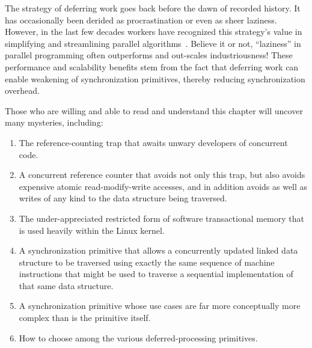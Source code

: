 
%

The strategy of deferring work goes back before the dawn of recorded
history.
It has occasionally been derided as procrastination or even as sheer laziness.
However, in the last few decades workers have recognized this strategy's value
in simplifying and streamlining parallel algorithms~\cite{Kung80,
HMassalinPhD,ValerieAurora2008Synthesis}.
Believe it or not, ``laziness'' in parallel programming often outperforms and
out-scales industriousness!
These performance and scalability benefits stem from the fact that
deferring work can enable weakening of synchronization primitives,
thereby reducing synchronization overhead.

Those who are willing and able to read and understand this chapter
will uncover many mysteries, including:

\begin{enumerate}
\item	The reference-counting trap that awaits unwary developers of
	concurrent code.
\label{sec:defer:Mysteries reference-counting trap}
\item	A concurrent reference counter that avoids not only this trap,
	but also avoids expensive atomic read-modify-write accesses,
	and in addition avoids as well as writes of any kind to the data
	structure being traversed.
\label{sec:defer:Mysteries hazard pointers}
\item	The under-appreciated restricted form of software transactional
	memory that is used heavily within the Linux kernel.
\label{sec:defer:Mysteries sequence locking}
\item	A synchronization primitive that allows a concurrently updated
	linked data structure to be traversed using exactly the same
	sequence of machine instructions that might be used to traverse
	a sequential implementation of that same data structure.
\label{sec:defer:Mysteries RCU}
\item	A synchronization primitive whose use cases are far more
	conceptually more complex than is the primitive itself.
\label{sec:defer:Mysteries RCU Use Cases}
\item	How to choose among the various deferred-processing primitives.
\label{sec:defer:Mysteries Which to choose}
\end{enumerate}

